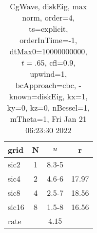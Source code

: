 \begin{table}[H]\tableFont %
\begin{center}
\begin{tabular}{|l|c|c|c|} \hline 
grid  & N &  $ u $ & r \\ \hline 
      sic2 &     1 & \num{8.3}{-5} &        \\ \hline
      sic4 &     2 & \num{4.6}{-6} & 17.97  \\ \hline
      sic8 &     4 & \num{2.5}{-7} & 18.56  \\ \hline
     sic16 &     8 & \num{1.5}{-8} & 16.56  \\ \hline
    rate             &       &  $4.15$       &       \\ \hline
\end{tabular}
\caption{CgWave, diskEig, max norm, order=$4$, ts=explicit, orderInTime=-1, dtMax0=$10000000000$, $t=.65$, cfl=$0.9$, upwind=1, bcApproach=cbc, -known=diskEig, kx=1, ky=0, kz=0, nBessel=1, mTheta=1, Fri Jan 21 06:23:30 2022}\label{table:diskEigOrder4max}
\end{center}
\end{table}
